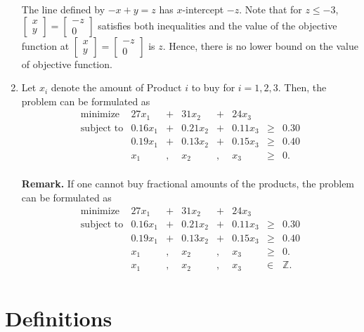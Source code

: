 \documentclass[]{book}
\theoremstyle{definition}
\theoremstyle{definition}
\theoremstyle{remark}
\begin{document}
\begin{enumerate}
  The line defined by \(-x + y = z\) has \(x\)-intercept \(-z\). Note
  that for \(z \leq -3\),
  \(\begin{bmatrix} x\\y \end{bmatrix} = \begin{bmatrix} -z\\ 0\end{bmatrix}\)
  satisfies both inequalities and the value of the objective function at
  \(\begin{bmatrix} x\\y \end{bmatrix} = \begin{bmatrix} -z\\ 0\end{bmatrix}\)
  is \(z\). Hence, there is no lower bound on the value of objective
  function.
\item
  Let \(x_i\) denote the amount of Product \(i\) to buy for
  \(i = 1,2,3\). Then, the problem can be formulated as
  \[\begin{array}{rrcrcrll}
  \mbox{minimize } & 27 x_1 & + & 31 x_2 & + & 24 x_3 \\
  \mbox{subject to} 
  & 0.16 x_1 & + & 0.21 x_2 & + & 0.11 x_3 & \geq & 0.30 \\
  & 0.19 x_1 & + & 0.13 x_2 & + & 0.15 x_3 & \geq & 0.40 \\
  & x_1 & , & x_2 & , & x_3 & \geq & 0. \\
  \end{array}\]

  \textbf{Remark.} If one cannot buy fractional amounts of the products,
  the problem can be formulated as \[\begin{array}{rrcrcrll}
  \mbox{minimize } & 27 x_1 & + & 31 x_2 & + & 24 x_3 \\
  \mbox{subject to} 
  & 0.16 x_1 & + & 0.21 x_2 & + & 0.11 x_3 & \geq & 0.30 \\
  & 0.19 x_1 & + & 0.13 x_2 & + & 0.15 x_3 & \geq & 0.40 \\
  & x_1 & , & x_2 & , & x_3 & \geq & 0. \\
  & x_1 & , & x_2 & , & x_3 & \in & \mathbb{Z}. \\
  \end{array}\]
\end{enumerate}

\chapter{Definitions}\label{definitions}
\end{document}
